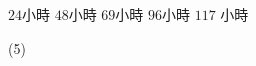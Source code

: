 \begin{QUESTIONS}
\begin{QUESTION}
\begin{QBODY}
			\begin{QOPS} 
				\QOP $24 $小時    
				\QOP $48 $小時    
				\QOP $69 $小時 
				\QOP $96 $小時    
				\QOP $117$ 小時
			\end{QOPS}
        \end{QBODY}
        \begin{QFROMS}
        \end{QFROMS}
        \begin{QTAGS}\end{QTAGS}
        \begin{QANS}
            (5)
        \end{QANS}
        \begin{QSOLLIST}
        \end{QSOLLIST}
        \begin{QEMPTYSPACE}
        \end{QEMPTYSPACE}
    \end{QUESTION}
\end{QUESTIONS}
